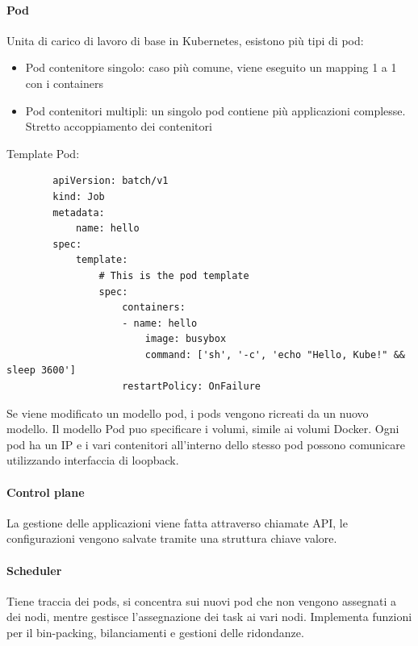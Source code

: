 \documentclass{article}
\begin{document}
		\paragraph{Pod}
		Unita di carico di lavoro di base in Kubernetes, esistono più tipi di pod:
		\begin{itemize}
		    \item Pod contenitore singolo: caso più comune, viene eseguito un mapping 1 a 1 con i containers
		    \item Pod contenitori multipli: un singolo pod contiene più applicazioni complesse. Stretto accoppiamento dei contenitori
		\end{itemize}
		Template Pod:
		\begin{verbatim}
		apiVersion: batch/v1
		kind: Job
		metadata:
		    name: hello
		spec:
		    template:
		        # This is the pod template
		        spec:
		            containers:
		            - name: hello
		                image: busybox
		                command: ['sh', '-c', 'echo "Hello, Kube!" && sleep 3600']
		            restartPolicy: OnFailure
		\end{verbatim}
		
		Se viene modificato un modello pod, i pods vengono ricreati da un nuovo modello. Il modello Pod puo specificare i volumi, simile ai volumi Docker. Ogni pod ha un IP e i vari contenitori all'interno dello stesso pod possono comunicare utilizzando interfaccia di loopback.
		
		\paragraph{Control plane}
		La gestione delle applicazioni viene fatta attraverso chiamate API, le configurazioni vengono salvate tramite una struttura chiave valore.
		
		\paragraph{Scheduler}
		Tiene traccia dei pods, si concentra sui nuovi pod che non vengono assegnati a dei nodi, mentre gestisce l'assegnazione dei task ai vari nodi. Implementa funzioni per il bin-packing, bilanciamenti e gestioni delle ridondanze.\\
		
\end{document}
